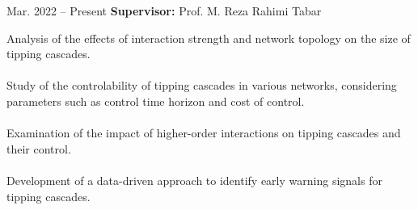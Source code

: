 \documentclass[9pt, purple]{./template/cv} %
\begin{document}
% 


\vspace{2mm}
\begin{entrylist}
	\entry
	{Mar. 2022 -- Present}
	{
         \textbf{Supervisor:} Prof. M. Reza Rahimi Tabar \\
        }
	{}
	{
		\begin{minipage}[t]{0.80\textwidth} %
			\vspace{-\baselineskip}
			\itemmarker Analysis of the effects of interaction strength and network topology on the size of tipping cascades.\\
			\vspace{-3mm}\\
			\itemmarker Study of the controlability of tipping cascades in various networks, considering parameters such as control time horizon and cost of control.\\
			\vspace{-3mm}\\
			\itemmarker Examination of the impact of higher-order interactions on tipping cascades and their control. \\
                \vspace{-3mm}\\
			\itemmarker Development of a data-driven approach to identify early warning signals for tipping cascades. \\
		\end{minipage}
  
}
\end{entrylist}
\end{document}
